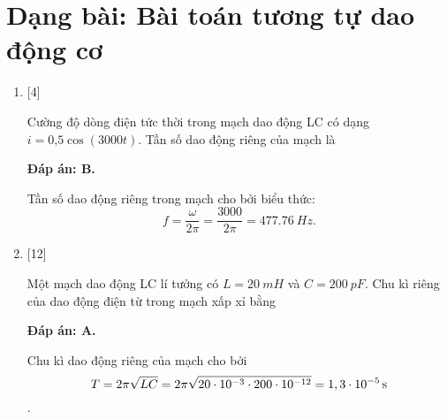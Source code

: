 \section{Dạng bài: Bài toán tương tự dao động cơ}
\begin{enumerate}[label=\bfseries Câu \arabic*:]

	\item {} [4]
	
	\cauhoi
	{Cường độ dòng điện tức thời trong mạch dao động LC có dạng $i = \text{0,5} \cos \left( 3000t \right)$. Tần số dao động riêng của mạch là  
	}
	
	\loigiai
	{		\textbf{Đáp án: B.}
		
Tần số dao động riêng trong mạch cho bởi biểu thức:
$$
f=\dfrac{\omega}{2 \pi}=\dfrac{3000}{2 \pi}= \SI{477,76}{Hz}.
$$
		
	}
	
	\item {} [12]
	
	\cauhoi
	{Một mạch dao động LC lí tưởng có $L = \SI{20}{mH}$ và $C = \SI{200}{pF}$. Chu kì riêng của dao động điện từ trong mạch xấp xỉ bằng
	}
	
	\loigiai
	{		\textbf{Đáp án: A.}
		
	Chu kì dao động riêng của mạch cho bởi 
	$$ T = 2\pi \sqrt{LC} = 2\pi \sqrt{20\cdot10^{-3} \cdot 200\cdot10^{-12}} = \xsi{1,3\cdot10^{-5}}{s} $$.
		
}
\end{enumerate}

